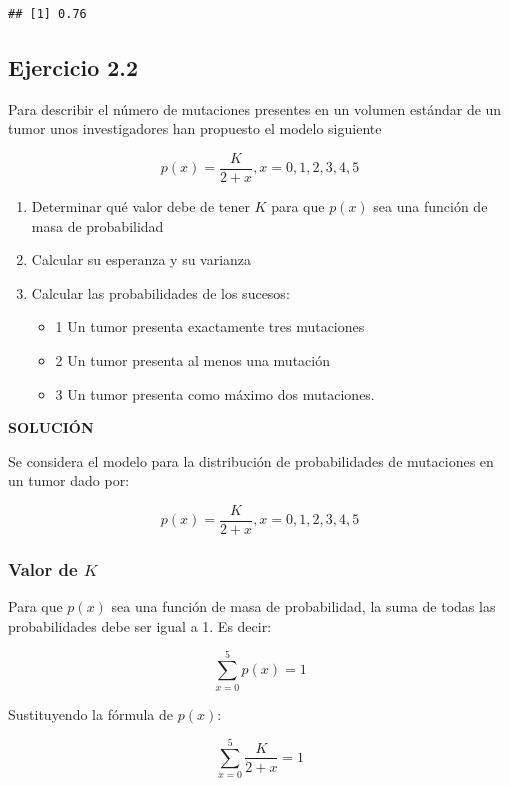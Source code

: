 \documentclass[
]{article}
\providecommand{\tightlist}{%
  \setlength{\itemsep}{0pt}\setlength{\parskip}{0pt}}
\begin{document}
\begin{verbatim}
## [1] 0.76
\end{verbatim}

\subsection{Ejercicio 2.2}\label{ejercicio-2.2}

Para describir el número de mutaciones presentes en un volumen estándar de un tumor unos investigadores han propuesto el modelo siguiente

\[
p(x)=\frac{K}{2+x}, x=0,1,2,3,4,5
\]

\begin{enumerate}
\def\labelenumi{\arabic{enumi}.}
\tightlist
\item
  Determinar qué valor debe de tener \(K\) para que \(p(x)\) sea una función de masa de probabilidad
\item
  Calcular su esperanza y su varianza
\item
  Calcular las probabilidades de los sucesos:

  \begin{itemize}
  \tightlist
  \item
    1 Un tumor presenta exactamente tres mutaciones
  \item
    2 Un tumor presenta al menos una mutación
  \item
    3 Un tumor presenta como máximo dos mutaciones.
  \end{itemize}
\end{enumerate}

\textbf{SOLUCIÓN}

Se considera el modelo para la distribución de probabilidades de mutaciones en un tumor dado por:

\[
p(x)=\frac{K}{2+x}, x=0,1,2,3,4,5
\]

\subsubsection{\texorpdfstring{Valor de \(K\)}{Valor de K}}\label{valor-de-k}

Para que \(p(x)\) sea una función de masa de probabilidad, la suma de todas las probabilidades debe ser igual a 1. Es decir:

\[
\sum_{x=0}^{5} p(x) = 1
\]

Sustituyendo la fórmula de \(p(x)\):

\[
\sum_{x=0}^{5} \frac{K}{2+x} = 1
\]
\end{document}
